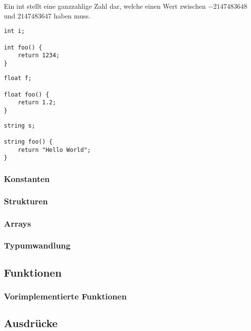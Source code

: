 
Ein int stellt eine ganzzahlige Zahl dar, welche einen Wert zwischen $-2147483648$ und $2147483647$ haben muss.

\begin{lstlisting}[language=CMM]
int i;

int foo() {
	return 1234;
}
\end{lstlisting}


\begin{lstlisting}[language=CMM]
float f;

float foo() {
	return 1.2;
}
\end{lstlisting}


\begin{lstlisting}[language=CMM]
string s;

string foo() {
	return "Hello World";
}
\end{lstlisting}

\subsubsection{Konstanten}

\subsubsection{Strukturen}

\subsubsection{Arrays}

\subsubsection{Typumwandlung}

\subsection{Funktionen}

\subsubsection{Vorimplementierte Funktionen}

\subsection{Ausdrücke}

